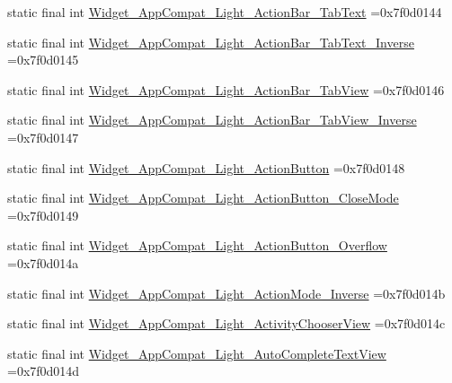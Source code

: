 \begin{DoxyCompactItemize}
\item 
static final int \mbox{\hyperlink{classcom_1_1example_1_1trainawearapplication_1_1_r_1_1style_a0a4726964887c5e8facedfaeeb3705e6}{Widget\+\_\+\+App\+Compat\+\_\+\+Light\+\_\+\+Action\+Bar\+\_\+\+Tab\+Text}} =0x7f0d0144
\item 
static final int \mbox{\hyperlink{classcom_1_1example_1_1trainawearapplication_1_1_r_1_1style_a64511b3c2ff399f321670363775c2458}{Widget\+\_\+\+App\+Compat\+\_\+\+Light\+\_\+\+Action\+Bar\+\_\+\+Tab\+Text\+\_\+\+Inverse}} =0x7f0d0145
\item 
static final int \mbox{\hyperlink{classcom_1_1example_1_1trainawearapplication_1_1_r_1_1style_a788c0d990348e327ccd67470343cb427}{Widget\+\_\+\+App\+Compat\+\_\+\+Light\+\_\+\+Action\+Bar\+\_\+\+Tab\+View}} =0x7f0d0146
\item 
static final int \mbox{\hyperlink{classcom_1_1example_1_1trainawearapplication_1_1_r_1_1style_ac1ddcd650e57034bc71960509b855d77}{Widget\+\_\+\+App\+Compat\+\_\+\+Light\+\_\+\+Action\+Bar\+\_\+\+Tab\+View\+\_\+\+Inverse}} =0x7f0d0147
\item 
static final int \mbox{\hyperlink{classcom_1_1example_1_1trainawearapplication_1_1_r_1_1style_a1efa136bfe841ebf167bb4ebf88e940a}{Widget\+\_\+\+App\+Compat\+\_\+\+Light\+\_\+\+Action\+Button}} =0x7f0d0148
\item 
static final int \mbox{\hyperlink{classcom_1_1example_1_1trainawearapplication_1_1_r_1_1style_aca9ad9b7bd1c7b4c26196c07e2d465a7}{Widget\+\_\+\+App\+Compat\+\_\+\+Light\+\_\+\+Action\+Button\+\_\+\+Close\+Mode}} =0x7f0d0149
\item 
static final int \mbox{\hyperlink{classcom_1_1example_1_1trainawearapplication_1_1_r_1_1style_ae97befca9665803b86c889b71386c8ca}{Widget\+\_\+\+App\+Compat\+\_\+\+Light\+\_\+\+Action\+Button\+\_\+\+Overflow}} =0x7f0d014a
\item 
static final int \mbox{\hyperlink{classcom_1_1example_1_1trainawearapplication_1_1_r_1_1style_a95ea3314879ae3365490116bbbdd993e}{Widget\+\_\+\+App\+Compat\+\_\+\+Light\+\_\+\+Action\+Mode\+\_\+\+Inverse}} =0x7f0d014b
\item 
static final int \mbox{\hyperlink{classcom_1_1example_1_1trainawearapplication_1_1_r_1_1style_a96193202ab839226d743d1f3ba3d2d34}{Widget\+\_\+\+App\+Compat\+\_\+\+Light\+\_\+\+Activity\+Chooser\+View}} =0x7f0d014c
\item 
static final int \mbox{\hyperlink{classcom_1_1example_1_1trainawearapplication_1_1_r_1_1style_aadb49fd915931e5b041c4a0ab475ffa8}{Widget\+\_\+\+App\+Compat\+\_\+\+Light\+\_\+\+Auto\+Complete\+Text\+View}} =0x7f0d014d

\end{DoxyCompactItemize}
